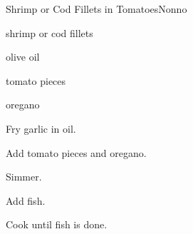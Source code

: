 \begin{recipe}{Shrimp or Cod Fillets in Tomatoes}{Nonno}{}

\begin{ingredients}
\item shrimp or cod fillets
\item olive oil
\item tomato pieces
\item oregano
\end{ingredients}

\begin{directions}
\item Fry garlic in oil.
\item Add tomato pieces and oregano.
\item Simmer.
\item Add fish.
\item Cook until fish is done.
\end{directions}

\end{recipe}
